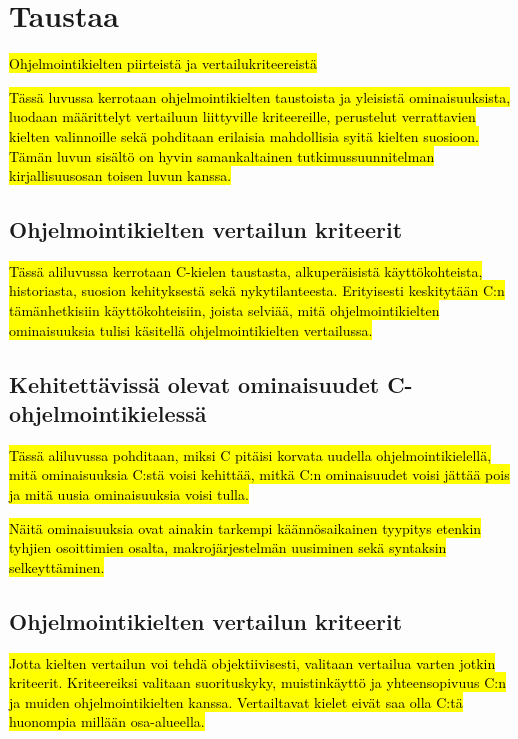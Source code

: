 \section{Taustaa}

\hl{Ohjelmointikielten piirteistä ja vertailukriteereistä}

\hl{Tässä luvussa kerrotaan ohjelmointikielten taustoista ja yleisistä
ominaisuuksista, luodaan määrittelyt vertailuun liittyville kriteereille,
perustelut verrattavien kielten valinnoille sekä pohditaan erilaisia
mahdollisia syitä kielten suosioon. Tämän luvun sisältö on hyvin samankaltainen
tutkimussuunnitelman kirjallisuusosan toisen luvun kanssa.}

\subsection{Ohjelmointikielten vertailun kriteerit}
\label{sec:ctaustaa}

\hl{Tässä aliluvussa kerrotaan C-kielen taustasta, alkuperäisistä käyttökohteista,
historiasta, suosion kehityksestä sekä nykytilanteesta. Erityisesti keskitytään
C:n tämänhetkisiin käyttökohteisiin, joista selviää, mitä ohjelmointikielten
ominaisuuksia tulisi käsitellä ohjelmointikielten vertailussa.}

\subsection{Kehitettävissä olevat ominaisuudet C-ohjelmointikielessä}

\hl{Tässä aliluvussa pohditaan, miksi C pitäisi korvata uudella
ohjelmointikielellä, mitä ominaisuuksia C:stä voisi kehittää, mitkä C:n
ominaisuudet voisi jättää pois ja mitä uusia ominaisuuksia voisi tulla.}

\hl{Näitä ominaisuuksia ovat ainakin tarkempi käännösaikainen tyypitys etenkin
tyhjien osoittimien osalta, makrojärjestelmän uusiminen sekä syntaksin
selkeyttäminen.}

\subsection{Ohjelmointikielten vertailun kriteerit}
\label{sec:abs}

\hl{Jotta kielten vertailun voi tehdä objektiivisesti, valitaan vertailua
varten jotkin kriteerit. Kriteereiksi valitaan suorituskyky, muistinkäyttö ja
yhteensopivuus C:n ja muiden ohjelmointikielten kanssa. Vertailtavat kielet
eivät saa olla C:tä huonompia millään osa-alueella.}

